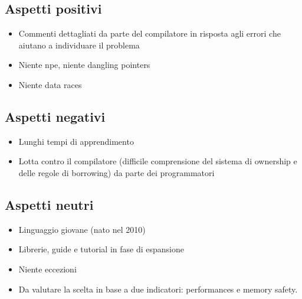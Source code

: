\subsection{Aspetti positivi}

\begin{itemize}
  \item Commenti dettagliati da parte del compilatore in risposta agli errori
che aiutano a individuare il problema
  \item Niente npe, niente dangling pointers
  \item Niente data races
\end{itemize}

\subsection{Aspetti negativi}

\begin{itemize}
  \item Lunghi tempi di apprendimento
  \item Lotta contro il compilatore (difficile comprensione del sistema di
ownership e delle regole di borrowing) da parte dei programmatori
\end{itemize}

\subsection{Aspetti neutri}

\begin{itemize}
  \item Linguaggio giovane (nato nel 2010)
  \item Librerie, guide e tutorial in fase di espansione
  \item Niente eccezioni
  \item Da valutare la scelta in base a due indicatori: performances e memory safety.
\end{itemize}
